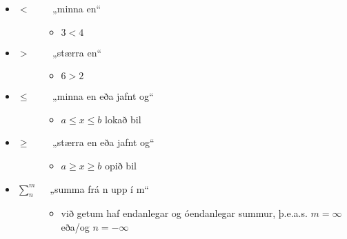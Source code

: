 \documentclass[a4paper,10pt,icelandic]{sphinxmanual}
\begin{document}
\begin{itemize}
\begin{description}
\begin{itemize}
\end{itemize}

\end{description}

\item {} \begin{description}
\item[{\(< \qquad\)  „minna en“}] \leavevmode\begin{itemize}
\item {} 
\(3<4\)

\end{itemize}

\end{description}

\item {} \begin{description}
\item[{\(> \qquad\) „stærra en“}] \leavevmode\begin{itemize}
\item {} 
\(6>2\)

\end{itemize}

\end{description}

\item {} \begin{description}
\item[{\(\leq \qquad\) „minna en eða jafnt og“}] \leavevmode\begin{itemize}
\item {} 
\(a \leq x \leq b\) lokað bil

\end{itemize}

\end{description}

\item {} \begin{description}
\item[{\(\geq \qquad\) „stærra en eða jafnt og“}] \leavevmode\begin{itemize}
\item {} 
\(a \geq x \geq b\) opið bil

\end{itemize}

\end{description}

\item {} \begin{description}
\item[{\(\sum_{n}^{m} \quad\) „summa frá n upp í m“}] \leavevmode\begin{itemize}
\item {} 
við getum haf endanlegar og óendanlegar summur, þ.e.a.s. \(m= \infty\) eða/og  \(n= -\infty\)


\end{itemize}
\end{description}
\end{itemize}
\end{document}
